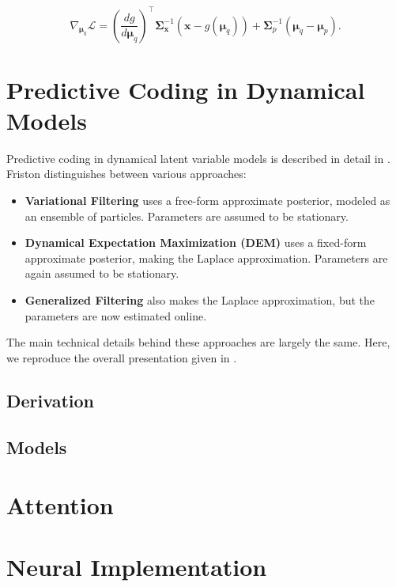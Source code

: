 \begin{equation}
	\nabla_{\bm{\mu}_q} \mathcal{L} =  \left( \frac{d g}{d \bm{\mu}_q} \right)^\intercal \bm{\Sigma}^{-1}_\mathbf{x} (\mathbf{x} - g(\bm{\mu}_q)) + \bm{\Sigma}^{-1}_p (\bm{\mu}_q - \bm{\mu}_p).
	\label{eq: multi-dimensional gradient}
\end{equation}

\section{Predictive Coding in Dynamical Models}

Predictive coding in dynamical latent variable models is described in detail in \cite{friston2008variational, friston2008DEM, friston2010generalised}. Friston distinguishes between various approaches:
\begin{itemize}
	\item \textbf{Variational Filtering} \cite{friston2008variational} uses a free-form approximate posterior, modeled as an ensemble of particles. Parameters are assumed to be stationary.
	\item \textbf{Dynamical Expectation Maximization (DEM)}  \cite{friston2008DEM} uses a fixed-form approximate posterior, making the Laplace approximation. Parameters are again assumed to be stationary.
	\item \textbf{Generalized Filtering} \cite{friston2010generalised} also makes the Laplace approximation, but the parameters are now estimated online.
\end{itemize}
The main technical details behind these approaches are largely the same. Here, we reproduce the overall presentation given in \cite{friston2008DEM}. 

\subsection{Derivation}

\subsection{Models}

\section{Attention}

\section{Neural Implementation}

